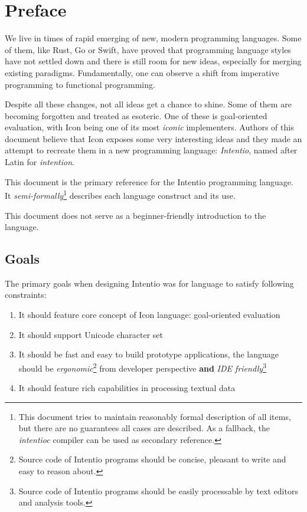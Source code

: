 \chapter{Preface}

We live in times of rapid emerging of new, modern programming languages. Some of them, like Rust\cite{TheRustProgrammingLanguage}, Go\cite{TheGoProgrammingLanguage} or Swift\cite{TheSwiftProgrammingLanguage}, have proved that programming language styles have not settled down and there is still room for new ideas, especially for merging existing paradigms. Fundamentally, one can observe a shift from imperative programming to functional programming.

Despite all these changes, not all ideas get a chance to shine. Some of them are becoming forgotten and treated as esoteric. One of these is goal-oriented evaluation, with Icon\cite{TheIconProgrammingLanguage} being one of its most \emph{iconic} implementers. Authors of this document believe that Icon exposes some very interesting ideas and they made an attempt to recreate them in a new programming language: \emph{Intentio}, named after Latin for \emph{intention}.

This document is the primary reference for the Intentio programming language. It \emph{semi-formally}\footnote{This document tries to maintain reasonably formal description of all items, but there are no guarantees all cases are described. As a fallback, the \emph{intentioc}\cite{intentioc} compiler can be used as secondary reference.} describes each language construct and its use.
 
This document does not serve as a beginner-friendly introduction to the language.

\section*{Goals}

The primary goals when designing Intentio was for language to satisfy following constraints:
\begin{enumerate}
  \item It should feature core concept of Icon language: goal-oriented evaluation
  \item It should support Unicode character set
  \item It should be fast and easy to build prototype applications, the language should be \emph{ergonomic}\footnote{Source code of Intentio programs should be concise, pleasant to write and easy to reason about.} from developer perspective \textbf{and} \emph{IDE friendly}\footnote{Source code of Intentio programs should be easily processable by text editors and analysis tools.}
  \item It should feature rich capabilities in processing textual data
\end{enumerate}

